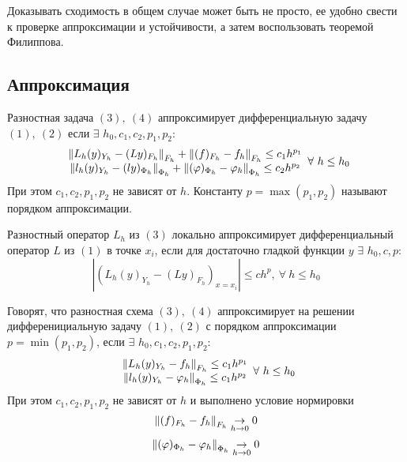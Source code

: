 Доказывать сходимость в общем случае может быть не просто, ее удобно свести
к проверке аппроксимации и устойчивости, а затем воспользовать теоремой Филиппова.

\subsection*{Аппроксимация}

\begin{definition}
  Разностная задача $(3),\ (4)$ аппроксимирует дифференциальную задачу $(1),\ (2)$
  если $\exists$ $h_0,c_1,c_2,p_1,p_2$:
  \[\begin{array}{c}
      \left\lVert L_h(y)_{Y_h} - (Ly)_{F_h}\right\rVert_{F_h}+\left\lVert(f)_{F_h}-f_h\right\rVert_{F_h}\leq c_1h^{p_1} \\
      \left\lVert l_h(y)_{Y_h} - (ly)_{\Phi_h}\right\rVert_{\Phi_h}+\left\lVert(\varphi)_{\Phi_h}-\varphi_h\right\rVert_{\Phi_h}\leq c_2h^{p_2}
    \end{array}\forall\ h\leq h_0\]
  При этом $c_1,c_2,p_1,p_2$ не зависят от $h$. Константу $p=\max(p_1,p_2)$ называют
  порядком аппроксимации.
\end{definition}

\begin{definition}
  Разностный оператор $L_h$ из $(3)$ локально аппроксимирует дифференциальный
  оператор $L$ из $(1)$ в точке $x_i$, если для достаточно
  гладкой функции $y$ $\exists$ $h_0,c,p$:
  \[|(L_h(y)_{Y_h} - (Ly)_{F_h})_{x=x_i}|\leq ch^p,\ \forall\ h\leq h_0\]
\end{definition}

\begin{definition}
  Говорят, что разностная схема $(3),\ (4)$ аппроксимирует на решении
  дифференициальную задачу $(1),\ (2)$ с порядком аппроксимации $p=\min(p_1,p_2)$,
  если $\exists$ $h_0,c_1,c_2,p_1,p_2$:
  \[\begin{array}{c}
      \left\lVert L_h(y)_{Y_h}-f_h\right\rVert_{F_h}\leq c_1h^{p_1} \\
      \left\lVert l_h(y)_{Y_h}-\varphi_h\right\rVert_{\Phi_h}\leq c_1h^{p_2}
    \end{array}\forall\ h\leq h_0\]
  При этом $c_1,c_2,p_1,p_2$ не зависят от $h$ и выполнено условие нормировки
  \[\left\lVert(f)_{F_h}-f_h\right\rVert_{F_h}\underset{h\rightarrow0}{\rightarrow}0\]
  \[\left\lVert(\varphi)_{\Phi_h}-\varphi_h\right\rVert_{\Phi_h}\underset{h\rightarrow0}{\rightarrow}0\]
\end{definition}

